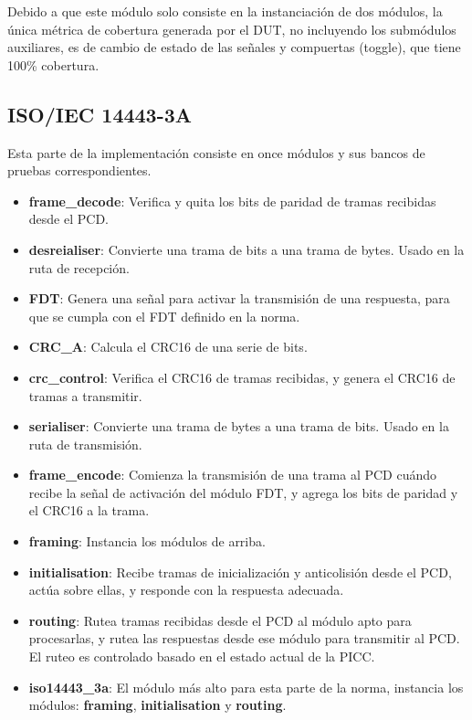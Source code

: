 \documentclass[a4paper, twoside, 11pt]{report}
\begin{document}
Debido a que este módulo solo consiste en la instanciación de dos módulos, la única métrica de cobertura generada por el DUT, no incluyendo los submódulos auxiliares, es de cambio de estado de las señales y compuertas (toggle), que tiene 100\% cobertura.

\FloatBarrier
\subsection{ISO/IEC 14443-3A}

Esta parte de la implementación consiste en once módulos y sus bancos de pruebas correspondientes.

\begin{itemize}
  \item \textbf{frame\_decode}: Verifica y quita los bits de paridad de tramas recibidas desde el PCD.
  \item \textbf{desreialiser}: Convierte una trama de bits a una trama de bytes. Usado en la ruta de recepción.
  \item \textbf{FDT}: Genera una señal para activar la transmisión de una respuesta, para que se cumpla con el FDT definido en la norma.
  \item \textbf{CRC\_A}: Calcula el CRC16 de una serie de bits.
  \item \textbf{crc\_control}: Verifica el CRC16 de tramas recibidas, y genera el CRC16 de tramas a transmitir.
  \item \textbf{serialiser}: Convierte una trama de bytes a una trama de bits. Usado en la ruta de transmisión.
  \item \textbf{frame\_encode}: Comienza la transmisión de una trama al PCD cuándo recibe la señal de activación del módulo FDT, y agrega los bits de paridad y el CRC16 a la trama.
  \item \textbf{framing}: Instancia los módulos de arriba.
  \item \textbf{initialisation}: Recibe tramas de inicialización y anticolisión desde el PCD, actúa sobre ellas, y responde con la respuesta adecuada.
  \item \textbf{routing}: Rutea tramas recibidas desde el PCD al módulo apto para procesarlas, y rutea las respuestas desde ese módulo para transmitir al PCD. El ruteo es controlado basado en el estado actual de la PICC.
  \item \textbf{iso14443\_3a}: El módulo más alto para esta parte de la norma, instancia los módulos: \textbf{framing}, \textbf{initialisation} y \textbf{routing}.
\end{itemize}
\end{document}
